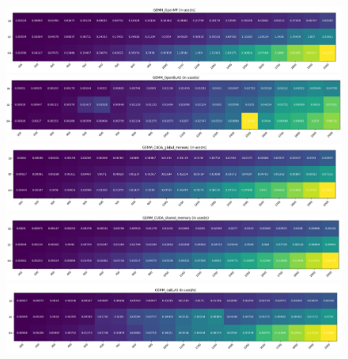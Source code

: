 \documentclass[12pt]{ctexart}
\begin{document}
\begin{figure}
    \setlength{\leftskip}{-110pt}
    \includegraphics[scale=0.47]{1s}
    \includegraphics[scale=0.47]{2s}
    \includegraphics[scale=0.47]{3s}
    \includegraphics[scale=0.47]{4s}
    \includegraphics[scale=0.47]{5s}
\end{figure}
\end{document}
